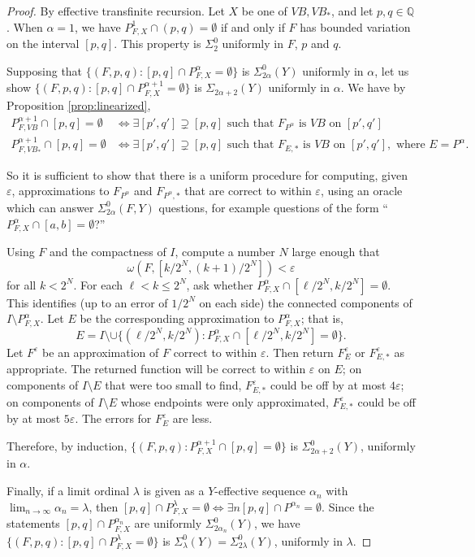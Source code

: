 \documentclass[12pt]{amsart}
\newcommand{\eps}{\varepsilon}
\begin{document}
\begin{proof}
By effective transfinite recursion.  Let $X$ be one of $VB, VB_\ast$, 
and let $p,q \in \mathbb Q$.
When $\alpha = 1$, we have $P^1_{F,X} \cap (p,q) = \emptyset$ if and only 
if $F$ has bounded variation on the 
interval $[p,q]$.  This property  is $\Sigma^0_2$
 uniformly in $F$, $p$ and $q$.

Supposing that $\{(F,p,q) : [p,q]  \cap P^\alpha_{F,X} = \emptyset\}$ is 
$\Sigma^0_{2\alpha}(Y)$ uniformly in $\alpha$, let us show 
$\{ (F, p,q): [p,q] \cap P^{\alpha+1}_{F,X} = \emptyset\}$ is 
$\Sigma_{2\alpha+2}(Y)$ uniformly in $\alpha$.
We have by Proposition \ref{prop:linearized},
\begin{align*} P^{\alpha+1}_{F,VB} \cap [p,q] = \emptyset &\iff 
\exists [p',q']\supsetneq [p,q] \text{ such that } F_{P^\alpha} 
\text{ is $VB$ on } [p',q'] \\
P^{\alpha+1}_{F,VB_\ast} \cap [p,q] = \emptyset &\iff 
\exists [p',q'] \supsetneq [p,q] \text{ such that } F_{E,\ast} 
\text{ is $VB$ on } [p',q'], \text{ where } E= P^\alpha.
\end{align*}

So it is sufficient to show that 
there is a uniform procedure for computing, given $\eps$, approximations
to $F_{P^\alpha}$ and $F_{P^\alpha,\ast}$ that are correct to within $\eps$, 
using an oracle which can answer $\Sigma^0_{2\alpha}(F,Y)$ questions,
for example questions of the form
``$P^{\alpha}_{F,X} \cap [a,b] = \emptyset$?''

Using $F$ and the compactness of $I$, compute a number $N$ large 
enough that $$\omega(F,[k/2^N, (k+1)/2^N]) < \eps$$ for all $k<2^N$.
For each $\ell<k\leq 2^N$, ask whether 
$P^{\alpha}_{F,X} \cap [\ell/2^N, k/2^N] = \emptyset$.  This identifies 
(up to an error of $1/2^N$ on each side) the connected components 
of $I\setminus P^{\alpha}_{F,X}$.  
Let $E$ be the corresponding approximation to $P^{\alpha}_{F,X}$; 
that is, 
$$E = I \setminus \cup \{(\ell/2^N, k/2^N) : 
P^{\alpha}_{F,X} \cap [\ell/2^N, k/2^N] = \emptyset\}.$$
Let $F^\eps$ be an approximation of $F$ 
correct to within $\eps$. Then return $F^\eps_{E}$ or $F^\eps_{E,\ast}$ 
as appropriate.  The returned function will be correct to 
within $\eps$ on $E$; on components of $I\setminus E$ that 
were too small to find, $F^\eps_{E,\ast}$ could be off by at 
most $4\eps$; on components of $I\setminus E$ whose 
endpoints were only approximated, $F^\eps_{E,\ast}$ could be 
off by at most $5\eps$.  The errors for $F^\eps_E$ are less.

Therefore, by induction,
$\{(F,p,q) : P^{\alpha+1}_{F,X} \cap [p,q] = \emptyset\}$ 
is $\Sigma^0_{2\alpha+2}(Y)$, uniformly in $\alpha$.

Finally, if a limit ordinal $\lambda$ is given as a $Y$-effective sequence 
$\alpha_n$ with $\lim_{n\rightarrow\infty} \alpha_n = \lambda$, then  
$[p,q]\cap P^\lambda_{F,X} = \emptyset 
\iff \exists n [p,q]\cap P^{\alpha_n} = \emptyset$.  
Since the statements $[p,q]\cap P^{\alpha_n}_{F,X}$ are 
uniformly $\Sigma^0_{2\alpha_n}(Y)$, we have 
$\{(F,p,q) : [p,q]\cap P^\lambda_{F,X} = \emptyset\}$ is
$\Sigma^0_{\lambda}(Y) = \Sigma^0_{2\lambda}(Y)$, uniformly 
in $\lambda$.
\end{proof}
\end{document}
